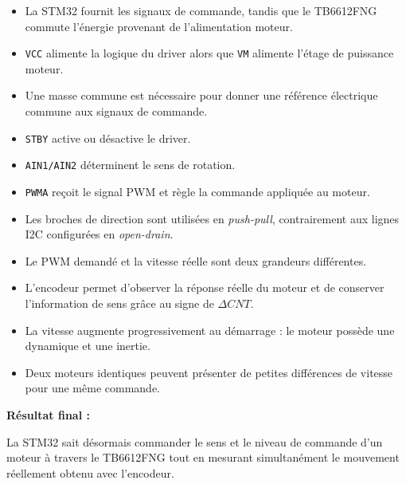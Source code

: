 \documentclass[11pt,a4paper]{article}
\begin{document}
\begin{sessionbox}
		\begin{itemize}
			\item La STM32 fournit les signaux de commande, tandis que le TB6612FNG commute l'énergie provenant de l'alimentation moteur.
			\item \texttt{VCC} alimente la logique du driver alors que \texttt{VM} alimente l'étage de puissance moteur.
			\item Une masse commune est nécessaire pour donner une référence électrique commune aux signaux de commande.
			\item \texttt{STBY} active ou désactive le driver.
			\item \texttt{AIN1/AIN2} déterminent le sens de rotation.
			\item \texttt{PWMA} reçoit le signal PWM et règle la commande appliquée au moteur.
			\item Les broches de direction sont utilisées en \textit{push-pull}, contrairement aux lignes I2C configurées en \textit{open-drain}.
			\item Le PWM demandé et la vitesse réelle sont deux grandeurs différentes.
			\item L'encodeur permet d'observer la réponse réelle du moteur et de conserver l'information de sens grâce au signe de $\Delta CNT$.
			\item La vitesse augmente progressivement au démarrage : le moteur possède une dynamique et une inertie.
			\item Deux moteurs identiques peuvent présenter de petites différences de vitesse pour une même commande.
		\end{itemize}
		
		\vspace{0.3cm}
		
		\textbf{Résultat final :}
		
		\begin{center}
		\end{center}
		
		La STM32 sait désormais commander le sens et le niveau de commande d'un moteur à travers le TB6612FNG tout en mesurant simultanément le mouvement réellement obtenu avec l'encodeur.
		

\end{sessionbox}
\end{document}
